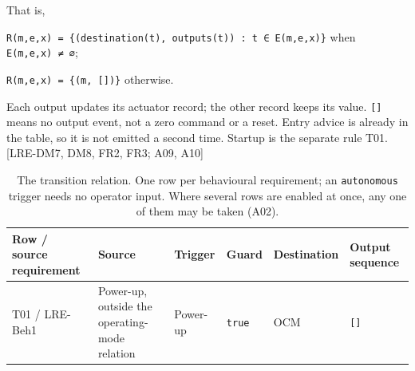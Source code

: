 \documentclass[
  10pt,
]{article}
\begin{document}
That is,

\texttt{R(m,e,x)\ =\ \{(destination(t),\ outputs(t))\ :\ t\ ∈\ E(m,e,x)\}}
when \texttt{E(m,e,x)\ ≠\ ∅};

\texttt{R(m,e,x)\ =\ \{(m,\ {[}{]})\}} otherwise.

Each output updates its actuator record; the other record keeps its
value. \texttt{{[}{]}} means no output event, not a zero command or a
reset. Entry advice is already in the table, so it is not emitted a
second time. Startup is the separate rule T01. {[}LRE-DM7, DM8, FR2,
FR3; A09, A10{]}

\begin{longtable}[]{@{}
  >{\raggedright\arraybackslash}p{}
  >{\raggedright\arraybackslash}p{}
  >{\raggedright\arraybackslash}p{}
  >{\raggedright\arraybackslash}p{}
  >{\raggedright\arraybackslash}p{}
  >{\raggedright\arraybackslash}p{}@{}}
\caption{The transition relation. One row per behavioural requirement; an \texttt{autonomous} trigger needs no operator input. Where several rows are enabled at once, any one of them may be taken (A02).}\label{tab:transitions}\\
\toprule\noalign{}
\begin{minipage}[b]{\linewidth}\raggedright
Row / source requirement
\end{minipage} & \begin{minipage}[b]{\linewidth}\raggedright
Source
\end{minipage} & \begin{minipage}[b]{\linewidth}\raggedright
Trigger
\end{minipage} & \begin{minipage}[b]{\linewidth}\raggedright
Guard
\end{minipage} & \begin{minipage}[b]{\linewidth}\raggedright
Destination
\end{minipage} & \begin{minipage}[b]{\linewidth}\raggedright
Output sequence
\end{minipage} \\
\midrule\noalign{}
\endhead
\bottomrule\noalign{}
\endlastfoot
T01 / LRE-Beh1 & Power-up, outside the operating-mode relation &
Power-up & \texttt{true} & OCM & \texttt{{[}{]}} \\

\end{longtable}
\end{document}

